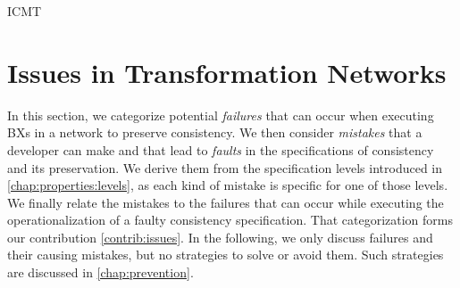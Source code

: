 \begin{copiedFrom}{ICMT}

\section{Issues in Transformation Networks}

In this section, we %
categorize potential \emph{failures} that can occur when executing \acp{BX} in a network to preserve consistency.
We then consider \emph{mistakes} that a developer can make and that lead to \emph{faults} in the specifications of consistency and its preservation.
We derive them from the specification levels introduced in \autoref{chap:properties:levels}, as each kind of mistake is specific for one of those levels.
We finally relate the mistakes to the failures that can occur while executing the operationalization of a faulty consistency specification.
That categorization forms our contribution \ref{contrib:issues}.
In the following, we only discuss failures and their causing mistakes, but no strategies to solve or avoid them.
Such strategies are discussed in \autoref{chap:prevention}.




\end{copiedFrom}
